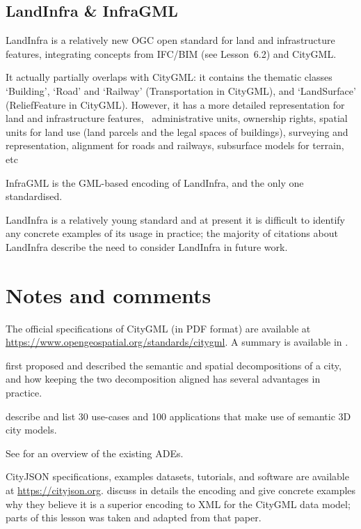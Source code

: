 \subsection{LandInfra \& InfraGML}

LandInfra is a relatively new OGC open standard for land and infrastructure features, integrating concepts from IFC/BIM (see Lesson~6.2) and CityGML\@.

It actually partially overlaps with CityGML: it contains the thematic classes `Building', `Road' and `Railway' (Transportation in CityGML), and `LandSurface' (ReliefFeature in CityGML). 
However, it has a more detailed representation for land and infrastructure features, \eg\ administrative units, ownership rights, spatial units for land use (land parcels and the legal spaces of buildings), surveying and representation, alignment for roads and railways, subsurface models for terrain, etc

InfraGML is the GML-based encoding of LandInfra, and the only one standardised.

LandInfra is a relatively young standard and at present it is difficult to identify any concrete examples of its usage in practice; the majority of citations about LandInfra describe the need to consider LandInfra in future work.


%
\section{Notes and comments}

The official specifications of CityGML (in PDF format) are available at \url{https://www.opengeospatial.org/standards/citygml}.
A summary is available in \citet{Groger12}.

\citep{Stadler07} first proposed and described the semantic and spatial decompositions of a city, and how keeping the two decomposition aligned has several advantages in practice.

\citet{Biljecki15a} describe and list 30 use-cases and 100 applications that make use of semantic 3D city models.

See \citet{Biljecki18} for an overview of the existing ADEs.

CityJSON specifications, examples datasets, tutorials, and software are available at \url{https://cityjson.org}.
\citet{Ledoux19} discuss in details the encoding and give concrete examples why they believe it is a superior encoding to XML for the CityGML data model; parts of this lesson was taken and adapted from that paper.

